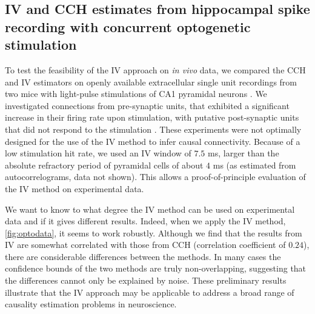 \documentclass[11pt]{article}
\begin{document}
\subsection{IV and CCH estimates from hippocampal spike recording with concurrent optogenetic stimulation}
To test the feasibility of the IV approach on \textit{in vivo} data, we compared the CCH and IV estimators on openly available extracellular single unit recordings from two mice with light-pulse stimulations of CA1 pyramidal neurons \citep{English2017}.
We investigated connections from pre-synaptic units, that exhibited a significant increase in their firing rate upon stimulation, with putative post-synaptic units that did not respond to the stimulation \citep{English2017}. 
These experiments were not optimally designed for the use of the IV method to infer causal connectivity.
Because of a low stimulation hit rate, we used an IV window of $ 7.5 $ ms, larger than the absolute refractory period of pyramidal cells of about $ 4 $ ms (as estimated from autocorrelograms, data not shown).
This allows a proof-of-principle evaluation of the IV method on experimental data.

We want to know to what degree the IV method can be used on experimental data and if it gives different results. 
Indeed, when we apply the IV method, \cref{fig:optodata}, it seems to work robustly. 
Although we find that the results from IV are somewhat correlated with those from CCH (correlation coefficient of $0.24$), there are considerable differences between the methods. 
In many cases the confidence bounds of the two methods are truly non-overlapping, suggesting that the differences cannot only be explained by noise. 
These preliminary results illustrate that the IV approach may be applicable to address a broad range of causality estimation problems in neuroscience.  
\end{document}
